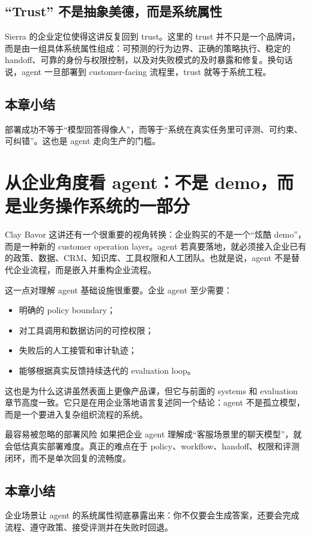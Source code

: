 \documentclass[a4paper]{article}
\begin{document}
\subsection{“Trust” 不是抽象美德，而是系统属性}
Sierra 的企业定位使得这讲反复回到 trust。这里的 trust 并不只是一个品牌词，而是由一组具体系统属性组成：可预测的行为边界、正确的策略执行、稳定的 handoff、可靠的身份与权限控制，以及对失败模式的及时暴露和修复。换句话说，agent 一旦部署到 customer-facing 流程里，trust 就等于系统工程。

\subsection{本章小结}
部署成功不等于“模型回答得像人”，而等于“系统在真实任务里可评测、可约束、可纠错”。这也是 agent 走向生产的门槛。

\section{从企业角度看 agent：不是 demo，而是业务操作系统的一部分}
Clay Bavor 这讲还有一个很重要的视角转换：企业购买的不是一个“炫酷 demo”，而是一种新的 customer operation layer。agent 若真要落地，就必须接入企业已有的政策、数据、CRM、知识库、工具权限和人工团队。也就是说，agent 不是替代企业流程，而是嵌入并重构企业流程。

这一点对理解 agent 基础设施很重要。企业 agent 至少需要：
\begin{itemize}[leftmargin=1.5em]
\item 明确的 policy boundary；
\item 对工具调用和数据访问的可控权限；
\item 失败后的人工接管和审计轨迹；
\item 能够根据真实反馈持续迭代的 evaluation loop。
\end{itemize}

这也是为什么这讲虽然表面上更像产品课，但它与前面的 systems 和 evaluation 章节高度一致。它只是在用企业落地语言复述同一个结论：agent 不是孤立模型，而是一个要进入复杂组织流程的系统。

\begin{warningbox}{最容易被忽略的部署风险}
如果把企业 agent 理解成“客服场景里的聊天模型”，就会低估真实部署难度。真正的难点在于 policy、workflow、handoff、权限和评测闭环，而不是单次回复的流畅度。
\end{warningbox}

\subsection{本章小结}
企业场景让 agent 的系统属性彻底暴露出来：你不仅要会生成答案，还要会完成流程、遵守政策、接受评测并在失败时回退。
\end{document}
